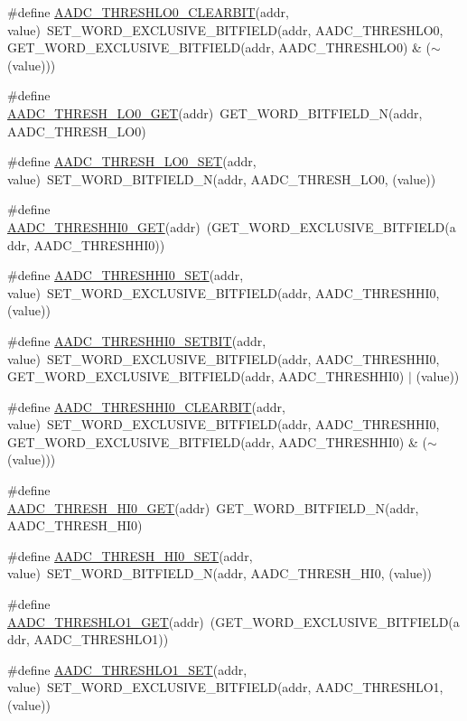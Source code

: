 \begin{DoxyCompactItemize}
\item 
\#define \hyperlink{a00542_a50f0a204f2a7e067266bf7c86b347678}{AADC\_\-THRESHLO0\_\-CLEARBIT}(addr, value)~SET\_\-WORD\_\-EXCLUSIVE\_\-BITFIELD(addr, AADC\_\-THRESHLO0, GET\_\-WORD\_\-EXCLUSIVE\_\-BITFIELD(addr, AADC\_\-THRESHLO0) \& ($\sim$(value)))
\item 
\#define \hyperlink{a00542_aa393cbf976e2eb3b45d821e2c62fde33}{AADC\_\-THRESH\_\-LO0\_\-GET}(addr)~GET\_\-WORD\_\-BITFIELD\_\-N(addr, AADC\_\-THRESH\_\-LO0)
\item 
\#define \hyperlink{a00542_a7a53253e2365e8cb4ba383c01f4d3504}{AADC\_\-THRESH\_\-LO0\_\-SET}(addr, value)~SET\_\-WORD\_\-BITFIELD\_\-N(addr, AADC\_\-THRESH\_\-LO0, (value))
\item 
\#define \hyperlink{a00542_a4fe30b25a3f95ac16fab78764f83a2f8}{AADC\_\-THRESHHI0\_\-GET}(addr)~(GET\_\-WORD\_\-EXCLUSIVE\_\-BITFIELD(addr, AADC\_\-THRESHHI0))
\item 
\#define \hyperlink{a00542_aaebdce52aad025104133090841352646}{AADC\_\-THRESHHI0\_\-SET}(addr, value)~SET\_\-WORD\_\-EXCLUSIVE\_\-BITFIELD(addr, AADC\_\-THRESHHI0, (value))
\item 
\#define \hyperlink{a00542_afaa35ccc6045c36946afebe7b0de6d76}{AADC\_\-THRESHHI0\_\-SETBIT}(addr, value)~SET\_\-WORD\_\-EXCLUSIVE\_\-BITFIELD(addr, AADC\_\-THRESHHI0, GET\_\-WORD\_\-EXCLUSIVE\_\-BITFIELD(addr, AADC\_\-THRESHHI0) $|$ (value))
\item 
\#define \hyperlink{a00542_a4c8b6c1bafe53c4dea809b320342fc27}{AADC\_\-THRESHHI0\_\-CLEARBIT}(addr, value)~SET\_\-WORD\_\-EXCLUSIVE\_\-BITFIELD(addr, AADC\_\-THRESHHI0, GET\_\-WORD\_\-EXCLUSIVE\_\-BITFIELD(addr, AADC\_\-THRESHHI0) \& ($\sim$(value)))
\item 
\#define \hyperlink{a00542_a5c898c99d4ac1f08e573f1d368dc99a0}{AADC\_\-THRESH\_\-HI0\_\-GET}(addr)~GET\_\-WORD\_\-BITFIELD\_\-N(addr, AADC\_\-THRESH\_\-HI0)
\item 
\#define \hyperlink{a00542_ae85db3238cdacf838400cb488591bb6b}{AADC\_\-THRESH\_\-HI0\_\-SET}(addr, value)~SET\_\-WORD\_\-BITFIELD\_\-N(addr, AADC\_\-THRESH\_\-HI0, (value))
\item 
\#define \hyperlink{a00542_a41116488251f659bd7bd98f6b79b727b}{AADC\_\-THRESHLO1\_\-GET}(addr)~(GET\_\-WORD\_\-EXCLUSIVE\_\-BITFIELD(addr, AADC\_\-THRESHLO1))
\item 
\#define \hyperlink{a00542_a7c5657b90d33eca8b8235e1ae5011937}{AADC\_\-THRESHLO1\_\-SET}(addr, value)~SET\_\-WORD\_\-EXCLUSIVE\_\-BITFIELD(addr, AADC\_\-THRESHLO1, (value))
\item 

\end{DoxyCompactItemize}
